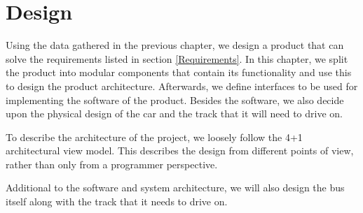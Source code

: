\chapter{Design}

Using the data gathered in the previous chapter, we design a product that can solve the requirements listed in section \ref{Requirements}. In this chapter, we split the product into modular components that contain its functionality and use this to design the product architecture. Afterwards, we define interfaces to be used for implementing the software of the product. Besides the software, we also decide upon the physical design of the car and the track that it will need to drive on. 

To describe the architecture of the project, we loosely follow the 4+1 architectural view model. This describes the design from different points of view, rather than only from a programmer perspective. 

Additional to the software and system architecture, we will also design the bus itself along with the track that it needs to drive on. 









